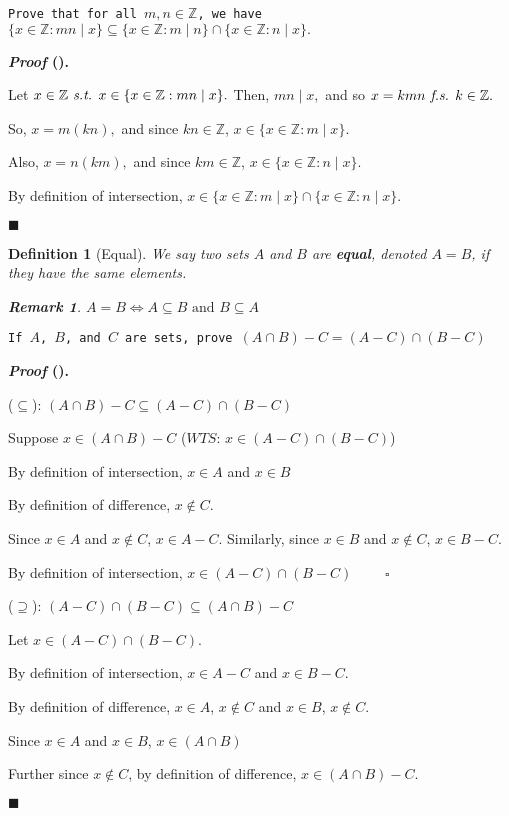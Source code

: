 \documentclass[12pt,a4paper]{article}
\newtheorem{df}{Definition}[subsection]
\newcounter{nprf}[subsection]
\newtheorem*{rmk}{\indent Remark}
\newenvironment*{prf}{\par\indent\textbf{\textit{Proof} (\stepcounter{nprf}\thenprf). }\par}{\par\hfill $\blacksquare$\par}
\def\Z{{\mathbb{Z}}}
\def\st{\emph{ s.t. }}
\def\fs{\emph{ f.s. }}
\def\WTS{\mathit{WTS}}
\begin{document}
\begin{framed}
\noindent\texttt{Prove that for all $m,n\in\Z$, we have $\{x\in\Z: mn\mid x\}\subseteq\{x\in\Z:m\mid n\}\cap\{x\in\Z:n\mid x\}.$}	
\begin{prf}
	Let $x\in\Z\st x\in\{x\in\Z: mn\mid x\}.$ Then, $mn\mid x,$ and so $x=kmn\fs k\in\Z.$\par So, $x=m(kn),$ and since $kn\in\Z$, $x\in\{x\in\Z:m\mid x\}$.\par Also, $x=n(km),$ and since $km\in\Z$, $x\in\{x\in\Z:n\mid x\}$.\par By definition of intersection, $x\in\{x\in\Z:m\mid x\}\cap\{x\in\Z:n\mid x\}$.
\end{prf}
\end{framed}
\begin{df}[Equal]
	We say two sets $A$ and $B$ are \textbf{equal}, denoted $A=B$, if they have the same elements.
	\begin{rmk}
		$A=B\iff A\subseteq B\text{ and }B\subseteq A$	
	\end{rmk}
\end{df}
\begin{framed}
\noindent\texttt{If $A$, $B$, and $C$ are sets, prove $(A\cap B)-C=(A-C)\cap(B-C)$}
\begin{prf}
	($\subseteq$): $(A\cap B)-C\subseteq(A-C)\cap(B-C)$\par\hspace{5mm}Suppose $x\in(A\cap B)-C$ ($\WTS$: $x\in(A-C)\cap(B-C)$)\par\hspace{5mm}By definition of intersection, $x\in A$ and $x\in B$\par\hspace{5mm}By definition of difference, $x\notin C.$\par\hspace{5mm}Since $x\in A$ and $x\notin C$, $x\in A-C$. Similarly, since $x\in B$ and $x\notin C$, $x\in B-C$.\par\hspace{5mm}By definition of intersection, $x\in(A-C)\cap(B-C)$ $\qquad\square$\par
	($\supseteq$): $(A-C)\cap(B-C)\subseteq(A\cap B)-C$\par\hspace{5mm}Let $x\in(A-C)\cap(B-C)$.\par\hspace{5mm}By definition of intersection, $x\in A-C$ and $x\in B-C$.\par\hspace{5mm}By definition of difference, $x\in A$, $x\notin C$ and $x\in B$, $x\notin C$.\par\hspace{5mm}Since $x\in A$ and $x\in B$, $x\in(A\cap B)$\par\hspace{5mm}Further since $x\notin C$, by definition of difference, $x\in(A\cap B)-C.$
\end{prf}
\end{framed}
\end{document}
